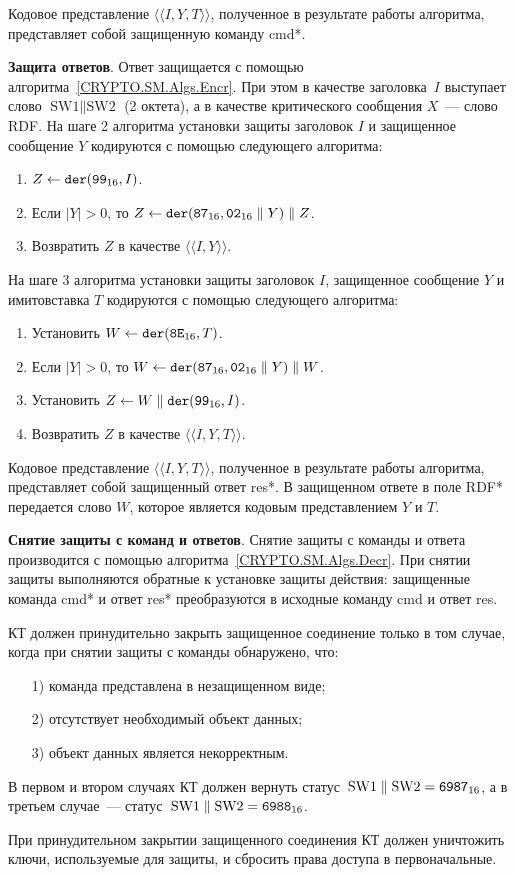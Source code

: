 Кодовое представление $\langle\langle I, Y, T \rangle\rangle$, полученное 
в результате работы алгоритма, представляет собой защищенную команду cmd*. 

{\bf Защита ответов}. 
Ответ защищается с помощью алгоритма~\ref{CRYPTO.SM.Algs.Encr}. При этом в 
качестве заголовка~$I$ выступает слово $\text{SW1} \parallel\text{SW2}$ 
(2 октета), а в качестве критического сообщения $X$~--- слово RDF. 
На шаге 2 алгоритма установки защиты заголовок $I$ и защищенное сообщение $Y$ 
кодируются с помощью следующего алгоритма: 

\begin{enumerate}
\item
$Z\gets \texttt{der}(\texttt{99}_{16}, I)$.
\item
Если $|Y| > 0$,  то $Z\gets \texttt{der}(\texttt{87}_{16}, \texttt{02}_{16} \parallel Y) \parallel Z$. 
\item
Возвратить $Z$ в качестве $\langle\langle I, Y \rangle\rangle$.
\end{enumerate}

На шаге 3 алгоритма установки защиты заголовок $I$, защищенное сообщение $Y$ и 
имитовставка $T$ кодируются с помощью следующего алгоритма: 

\begin{enumerate}
\item 
Установить $W\gets\texttt{der}(\texttt{8E}_{16}, T)$.
\item 
Если $|Y| > 0$, 
то $W \gets \texttt{der}(\texttt{87}_{16}, \texttt{02}_{16}\parallel Y) \parallel W$.
\item
Установить $Z \gets W \parallel \texttt{der}(\texttt{99}_{16}, I)$.
\item
Возвратить $Z$ в качестве $\langle \langle I, Y, T\rangle\rangle$.
\end{enumerate}

Кодовое представление  $\langle\langle I, Y, T \rangle\rangle$, 
полученное в результате работы алгоритма, 
представляет собой защищенный ответ res*. 
В защищенном ответе в поле RDF* передается слово $W$, 
которое является кодовым представлением $Y$ и $T$. 

{\bf Снятие защиты с команд и ответов}. 
%
Снятие защиты с команды и ответа производится с помощью 
алгоритма~\ref{CRYPTO.SM.Algs.Decr}.  
При снятии защиты выполняются обратные к установке защиты действия: 
защищенные команда cmd* и ответ res* преобразуются в исходные команду cmd  
и ответ res.  

КТ должен принудительно закрыть защищенное соединение только в том случае, 
когда при снятии защиты с команды обнаружено, что: 
\begin{enumerate}
\item[1)] команда представлена в незащищенном виде;
\item[2)] отсутствует необходимый объект данных;
\item[3)] объект данных является некорректным.
\end{enumerate}

В первом и втором случаях КТ должен вернуть 
статус~$\text{SW1} \parallel \text{SW2} = \texttt{6987}_{16}$, 
а в третьем случае~--- статус~$\text{SW1} \parallel \text{SW2} = 
\texttt{6988}_{16}$.  

При принудительном закрытии защищенного соединения КТ должен уничтожить 
ключи, используемые для защиты, и сбросить права доступа в первоначальные. 
